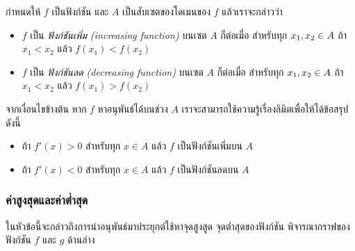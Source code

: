 \documentclass[hidelinks,12pt,a4paper]{article}
\newcommand{\s}{\space}
\begin{document}
\vspace{1mm}
กำหนดให้ $f$ เป็นฟังก์ชัน และ $A$ เป็นสับเซตของโดเมนของ $f$ แล้วเราจะกล่าวว่า
\begin{itemize}
    \item $f$ เป็น \emph{ฟังก์ชันเพิ่ม (increasing function)} บนเซต $A$ ก็ต่อเมื่อ \s สำหรับทุก $x_1,\s x_2\in A$ ถ้า $x_1<x_2$ แล้ว \s $f(x_1)<f(x_2)$
    \item $f$ เป็น \emph{ฟังก์ชันลด (decreasing function)} บนเซต $A$ ก็ต่อเมื่อ \s สำหรับทุก $x_1,\s x_2\in A$ ถ้า $x_1<x_2$ แล้ว \s $f(x_1)>f(x_2)$
\end{itemize}
จากเงื่อนไขข้างต้น หาก $f$ หาอนุพันธ์ได้บนช่วง $A$ เราจะสามารถใช้ความรู้เรื่องลิมิตเพื่อให้ได้ข้อสรุปดังนี้
\begin{center}
\begin{tcolorbox}[width=12cm]
\begin{itemize}
    \renewcommand{\labelitemi}{$*$}
    \item ถ้า $f'(x)>0$ สำหรับทุก $x\in A$ \s แล้ว $f$ เป็นฟังก์ชันเพิ่มบน $A$
    \item ถ้า $f'(x)<0$ สำหรับทุก $x\in A$ \s แล้ว $f$ เป็นฟังก์ชันลดบน $A$
\end{itemize}
\end{tcolorbox}
\end{center}


\newpage
\subsubsection{ค่าสูงสุดและค่าต่ำสุด}
ในหัวข้อนี้จะกล่าวถึงการนำอนุพันธ์มาประยุกต์ใช้หาจุดสูงสูด จุดต่ำสุดของฟังก์ชัน พิจารณากราฟของฟังก์ชัน $f$ และ $g$ ด้านล่าง
\end{document}
